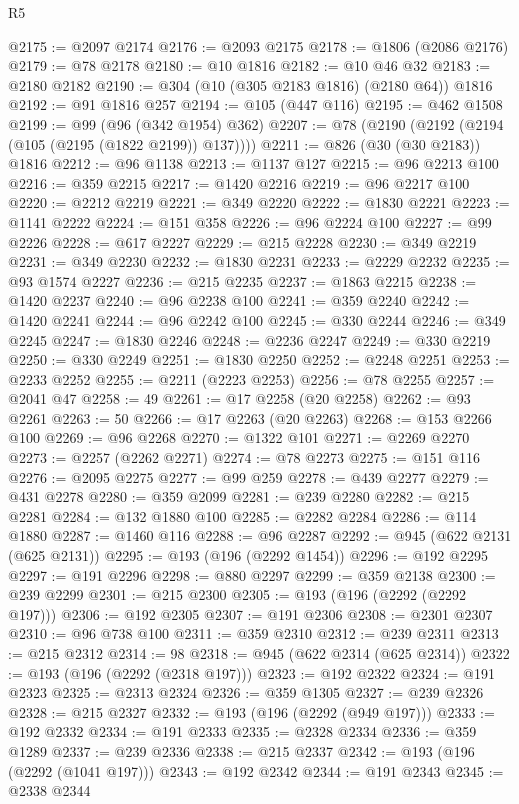 \begin{lexlean}{R5}
\begin{coremodule}
@2175 := @2097 @2174
@2176 := @2093 @2175
@2178 := @1806 (@2086 @2176)
@2179 := @78 @2178
@2180 := @10 @1816
@2182 := @10 @46 @32
@2183 := @2180 @2182
@2190 := @304 (@10 (@305 @2183 @1816) (@2180 @64)) @1816
@2192 := @91 @1816 @257
@2194 := @105 (@447 @116)
@2195 := @462 @1508
@2199 := @99 (@96 (@342 @1954) @362)
@2207 := @78 (@2190 (@2192 (@2194 (@105 (@2195 (@1822 @2199)) @137))))
@2211 := @826 (@30 (@30 @2183)) @1816
@2212 := @96 @1138
@2213 := @1137 @127
@2215 := @96 @2213 @100
@2216 := @359 @2215
@2217 := @1420 @2216
@2219 := @96 @2217 @100
@2220 := @2212 @2219
@2221 := @349 @2220
@2222 := @1830 @2221
@2223 := @1141 @2222
@2224 := @151 @358
@2226 := @96 @2224 @100
@2227 := @99 @2226
@2228 := @617 @2227
@2229 := @215 @2228
@2230 := @349 @2219
@2231 := @349 @2230
@2232 := @1830 @2231
@2233 := @2229 @2232
@2235 := @93 @1574 @2227
@2236 := @215 @2235
@2237 := @1863 @2215
@2238 := @1420 @2237
@2240 := @96 @2238 @100
@2241 := @359 @2240
@2242 := @1420 @2241
@2244 := @96 @2242 @100
@2245 := @330 @2244
@2246 := @349 @2245
@2247 := @1830 @2246
@2248 := @2236 @2247
@2249 := @330 @2219
@2250 := @330 @2249
@2251 := @1830 @2250
@2252 := @2248 @2251
@2253 := @2233 @2252
@2255 := @2211 (@2223 @2253)
@2256 := @78 @2255
@2257 := @2041 @47
@2258 := 49
@2261 := @17 @2258 (@20 @2258)
@2262 := @93 @2261
@2263 := 50
@2266 := @17 @2263 (@20 @2263)
@2268 := @153 @2266 @100
@2269 := @96 @2268
@2270 := @1322 @101
@2271 := @2269 @2270
@2273 := @2257 (@2262 @2271)
@2274 := @78 @2273
@2275 := @151 @116
@2276 := @2095 @2275
@2277 := @99 @259
@2278 := @439 @2277
@2279 := @431 @2278
@2280 := @359 @2099
@2281 := @239 @2280
@2282 := @215 @2281
@2284 := @132 @1880 @100
@2285 := @2282 @2284
@2286 := @114 @1880
@2287 := @1460 @116
@2288 := @96 @2287
@2292 := @945 (@622 @2131 (@625 @2131))
@2295 := @193 (@196 (@2292 @1454))
@2296 := @192 @2295
@2297 := @191 @2296
@2298 := @880 @2297
@2299 := @359 @2138
@2300 := @239 @2299
@2301 := @215 @2300
@2305 := @193 (@196 (@2292 (@2292 @197)))
@2306 := @192 @2305
@2307 := @191 @2306
@2308 := @2301 @2307
@2310 := @96 @738 @100
@2311 := @359 @2310
@2312 := @239 @2311
@2313 := @215 @2312
@2314 := 98
@2318 := @945 (@622 @2314 (@625 @2314))
@2322 := @193 (@196 (@2292 (@2318 @197)))
@2323 := @192 @2322
@2324 := @191 @2323
@2325 := @2313 @2324
@2326 := @359 @1305
@2327 := @239 @2326
@2328 := @215 @2327
@2332 := @193 (@196 (@2292 (@949 @197)))
@2333 := @192 @2332
@2334 := @191 @2333
@2335 := @2328 @2334
@2336 := @359 @1289
@2337 := @239 @2336
@2338 := @215 @2337
@2342 := @193 (@196 (@2292 (@1041 @197)))
@2343 := @192 @2342
@2344 := @191 @2343
@2345 := @2338 @2344

\end{coremodule}
\end{lexlean}
